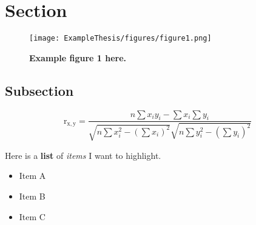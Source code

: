 \documentclass[../main.tex]{subfiles}
\begin{document}
\section{Section}

\lipsum[2]\citep{mittelbach2004latex}

\begin{figure}
\centering
 
  \texttt{[image: ExampleThesis/figures/figure1.png]}

  \caption[Example figure 1 here.]{\textbf{Example figure 1 here.} \lipsum[1]}
  
\end{figure}

\subsection{Subsection}
\lipsum[3] \citep{vanrossum2010python}

\begin{equation}
\mathrm{r_{x,y}} = \frac{n\sum{x_iy_i}-\sum{x_i}\sum{y_i}}{\sqrt{n\sum {x^2_i}-(\sum{x_i})^2}\sqrt{n\sum{y_i^2}-(\sum{y_i})^2}}
\end{equation}

Here is a \textbf{list} of \textit{items} I want to highlight.

\begin{itemize}
    \item Item A
    \item Item B
    \item Item C
\end{itemize}
\end{document}
